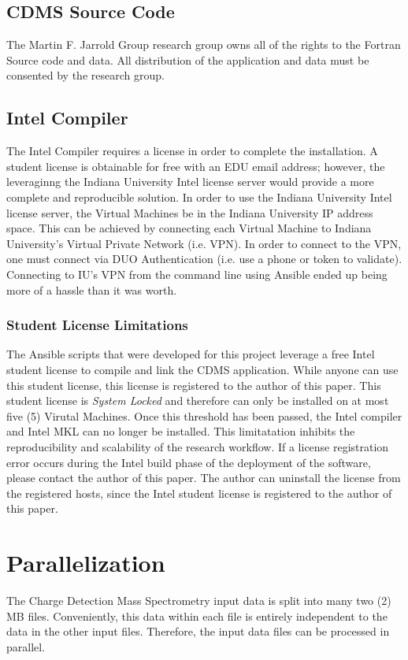 \documentclass[9pt,twocolumn,twoside]{../../styles/osajnl}
\begin{document}
\subsection{CDMS Source Code} \label{cdms-license}
The Martin F. Jarrold Group research group owns all of the rights to
the Fortran Source code and data. All distribution of the application
and data must be consented by the research group.
\subsection{Intel Compiler} \label{intel-license}
The Intel Compiler requires a license in order to complete the
installation. A student license is obtainable for free with an EDU
email address; however, the leveraginng the Indiana University Intel
license server would provide a more complete and reproducible
solution. In order to use the Indiana University Intel license server,
the Virtual Machines be in the Indiana University IP address
space. This can be achieved by connecting each Virtual Machine to
Indiana University's Virtual Private Network (i.e. VPN). In order to
connect to the VPN, one must connect via DUO Authentication (i.e. use
a phone or token to validate). Connecting to IU's VPN from the command
line using Ansible ended up being more of a hassle than it was
worth. 
\subsubsection{Student License Limitations} \label{student-license}
The Ansible scripts that were developed for this project leverage a
free Intel student license to compile and link the CDMS
application. While anyone can use this student license, this license
is registered to the author of this paper. This student license is
\emph{System Locked} and therefore can only be installed on at most
five (5) Virutal Machines. Once this threshold has been passed, the
Intel compiler and Intel MKL can no longer be installed. This
limitatation inhibits the reproducibility and scalability of the
research workflow. If a license registration error occurs during the
Intel build phase of the deployment of the software, please contact
the author of this paper. The author can uninstall the license from
the registered hosts, since the Intel student license is registered to
the author of this paper.

\section{Parallelization} \label{parallel}
The Charge Detection Mass Spectrometry input data is split into many
two (2) MB files. Conveniently, this data within each file is entirely
independent to the data in the other input files. Therefore, the input
data files can be processed in parallel.
\end{document}
